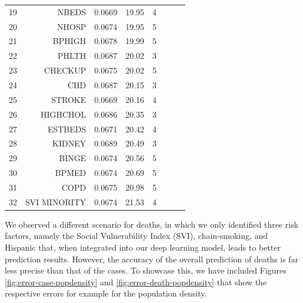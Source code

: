 \documentclass[a4paper, inpress]{jds} %
\renewcommand{\_}{%
    \textunderscore\hspace{0pt}%
}
\begin{document}
\begin{table}[!p]
\begin{tabular}{rrrrrlrl}
19	&	NBEDS	        &	0.0669	&	19.95	&	4	 \\
20	&	NHOSP	        &	0.0674	&	19.95	&	5	 \\
21	&	BPHIGH	        &	0.0678	&	19.99	&	5	 \\
22	&	PHLTH	        &	0.0687	&	20.02	&	3	 \\
23	&	CHECKUP	        &	0.0675	&	20.02	&	5	 \\
24	&	CHD	            &	0.0687	&	20.15	&	3	 \\
25	&	STROKE	        &	0.0669	&	20.16	&	4	 \\
26	&	HIGHCHOL	    &	0.0686	&	20.35	&	3	 \\
27	&	ESTBEDS	        &	0.0671	&	20.42	&	4	 \\
28	&	KIDNEY	        &	0.0689	&	20.49	&	3	 \\
29	&	BINGE	        &	0.0674	&	20.56	&	5	 \\
30	&	BPMED	        &	0.0674	&	20.69	&	5	 \\
31	&	COPD	        &	0.0675	&	20.98	&	5	 \\
32	&	SVI\_MINORITY	&	0.0674	&	21.53	&	4	 \\
\bottomrule
\end{tabular}
\end{table}

We observed a different scenario for deaths, in which we only
identified three risk factors, namely the Social Vulnerability Index
(SVI), chain-smoking, and Hispanic that, when integrated into our deep
learning model, leads to better prediction results. However, the
accuracy of the overall prediction of deaths is far less precise than
that of the cases.  To showcase this, we have included Figures
\ref{fig:error-case-popdensity} and \ref{fig:error-death-popdensity}
that show the respective errors for example for the population
density.
\end{document}
